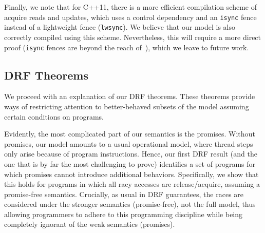 



Finally, we note that for C++11, there is a more efficient compilation scheme of acquire reads and updates, which uses a control dependency and an \texttt{isync} fence instead of a lightweight fence (\texttt{lwsync}).
We believe that our model is also correctly compiled using this scheme.
Nevertheless, this will require a more direct proof (\texttt{isync} fences are beyond the reach of~\cite{fm16}),
which we leave to future work.


\subsection{DRF Theorems}
\label{sec:drf}

We proceed with an explanation of our DRF theorems.
These theorems provide ways of restricting attention to better-behaved subsets
of the model assuming certain conditions on programs.

Evidently, the most complicated part of our semantics is the promises.
Without promises, our model amounts to a usual operational model,
where thread steps only arise because of program instructions.
Hence, our first DRF result (and the one that is by far the most challenging to prove)
identifies a set of programs for which promises cannot introduce additional behaviors.
Specifically, we show that this holds for programs in which all
racy accesses are release/acquire, %
assuming a promise-free semantics.
Crucially, as usual in DRF guarantees, the races are considered under the stronger
semantics (promise-free), not the full model, thus allowing programmers to adhere to this programming discipline
while being completely ignorant of the weak semantics (promises).

